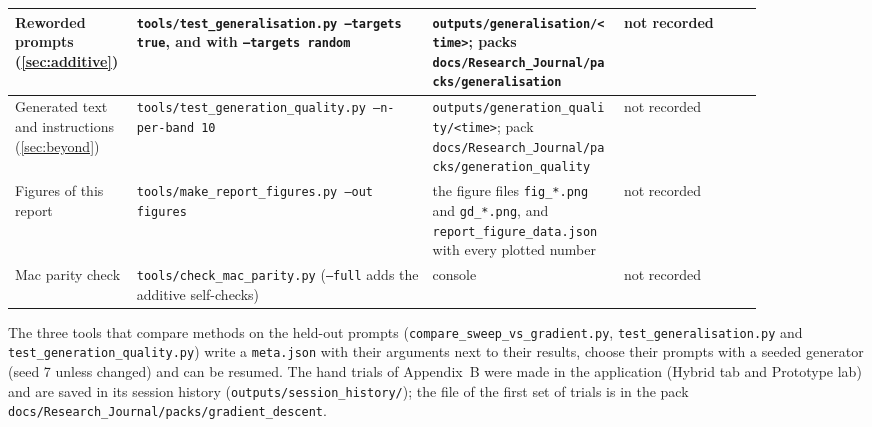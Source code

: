 \documentclass[12pt,a4paper]{report}
\begin{document}
{\begin{longtable}{|>{\raggedright\arraybackslash}p{0.148\linewidth}|>{\raggedright\arraybackslash}p{0.340\linewidth}|>{\raggedright\arraybackslash}p{0.222\linewidth}|>{\raggedright\arraybackslash}p{0.163\linewidth}|}
Reworded prompts (\ref{sec:additive}) & \texttt{tools/\allowbreak{}test\_\allowbreak{}generalisation.\allowbreak{}py --targets true}, and with \texttt{--targets random} & \texttt{outputs/\allowbreak{}generalisation/\allowbreak{}<time>}; packs \texttt{docs/\allowbreak{}Research\_\allowbreak{}Journal/\allowbreak{}packs/\allowbreak{}generalisation} & not recorded \\ \hline
Generated text and instructions (\ref{sec:beyond}) & \texttt{tools/\allowbreak{}test\_\allowbreak{}generation\_\allowbreak{}quality.\allowbreak{}py --n-per-band 10} & \texttt{outputs/\allowbreak{}generation\_\allowbreak{}quality/\allowbreak{}<time>}; pack \texttt{docs/\allowbreak{}Research\_\allowbreak{}Journal/\allowbreak{}packs/\allowbreak{}generation\_\allowbreak{}quality} & not recorded \\ \hline
Figures of this report & \texttt{tools/\allowbreak{}make\_\allowbreak{}report\_\allowbreak{}figures.\allowbreak{}py --out figures} & the figure files \texttt{fig\_\allowbreak{}*.\allowbreak{}png} and \texttt{gd\_\allowbreak{}*.\allowbreak{}png}, and \texttt{report\_\allowbreak{}figure\_\allowbreak{}data.\allowbreak{}json} with every plotted number & not recorded \\ \hline
Mac parity check & \texttt{tools/\allowbreak{}check\_\allowbreak{}mac\_\allowbreak{}parity.\allowbreak{}py} (\texttt{--full} adds the additive self-checks) & console & not recorded \\ \hline
\end{longtable}}

The three tools that compare methods on the held-out prompts (\texttt{compare\_\allowbreak{}sweep\_\allowbreak{}vs\_\allowbreak{}gradient.\allowbreak{}py}, \texttt{test\_\allowbreak{}generalisation.\allowbreak{}py} and \texttt{test\_\allowbreak{}generation\_\allowbreak{}quality.\allowbreak{}py}) write a \texttt{meta.\allowbreak{}json} with their arguments next to their results, choose their prompts with a seeded generator (seed 7 unless changed) and can be resumed. The hand trials of Appendix~B were made in the application (Hybrid tab and Prototype lab) and are saved in its session history (\texttt{outputs/\allowbreak{}session\_\allowbreak{}history/\allowbreak{}}); the file of the first set of trials is in the pack \texttt{docs/\allowbreak{}Research\_\allowbreak{}Journal/\allowbreak{}packs/\allowbreak{}gradient\_\allowbreak{}descent}.
\end{document}
